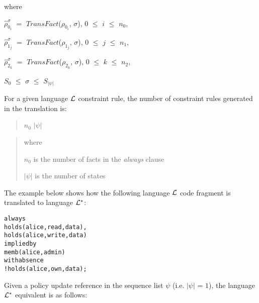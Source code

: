 \documentclass[11pt]{report}
\newenvironment{vverbatim}
{
  \begin{alltt}
}
{
    \vspace{-\baselineskip}
  \end{alltt}
}
\newenvironment{vquote}
{
  \begin{list}{}{\leftmargin 1em}\item[]
}
{
  \end{list}
}
\begin{document}
          \begin{vquote}
            where

            \hspace{1em}
            $\hat{\rho}^{\sigma}_{0_i}$ $=$
              $TransFact$($\rho_{0_i}$, $\sigma$), $0$ $\leq$ $i$ $\leq$ $n_0$,

            \hspace{1em}
            $\hat{\rho}^{\sigma}_{1_j}$ $=$
              $TransFact$($\rho_{1_j}$, $\sigma$), $0$ $\leq$ $j$ $\leq$ $n_1$,

            \hspace{1em}
            $\hat{\rho}^{\sigma}_{2_k}$ $=$
              $TransFact$($\rho_{2_k}$, $\sigma$), $0$ $\leq$ $k$ $\leq$ $n_2$,

            \hspace{1em}
            $S_{0}$ $\leq$ $\sigma$ $\leq$ $S_{|\psi|}$
          \end{vquote}

          For a given language ${\cal L}$ constraint rule, the number of
          constraint rules generated in the translation is:

          \begin{quote}
            $n_0$ $|\psi|$
          \end{quote}

          \begin{quote}
            where

            \hspace{1em}
            $n_0$ is the number of facts in the {\em always} clause

            \hspace{1em}
            $|\psi|$ is the number of states
          \end{quote}

          The example below shows how the following language ${\cal L}$ code
          fragment is translated to language ${\cal L}^{*}$:

          \begin{vverbatim}
  always
    holds(alice, read, data),
    holds(alice, write, data)
  implied by
    memb(alice, admin)
  with absence
    !holds(alice, own, data);
          \end{vverbatim}

          \noindent
          Given a policy update reference in the sequence list $\psi$ (i.e.
          $|\psi|$ = $1$), the language ${\cal L}^{*}$ equivalent is as
          follows:
\end{document}
